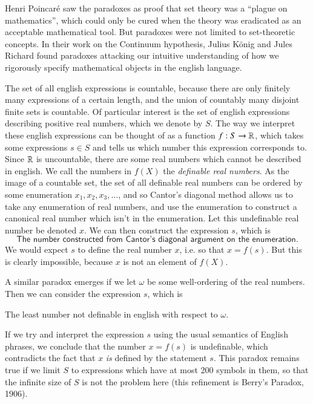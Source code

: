 Henri Poincar\'{e} saw the paradoxes as proof that set theory was a ``plague on mathematics'', which could only be cured when the theory was eradicated as an acceptable mathematical tool. But paradoxes were not limited to set-theoretic concepts. In their work on the Continuum hypothesis, Julius K\"{o}nig and Jules Richard found paradoxes attacking our intuitive understanding of how we rigorously specify mathematical objects in the english language.

\begin{example}
    The set of all english expressions is countable, because there are only finitely many expressions of a certain length, and the union of countably many disjoint finite sets is countable. Of particular interest is the set of english expressions describing positive real numbers, which we denote by $S$. The way we interpret these english expressions can be thought of as a function $f: S \to \operatorname{\mathbb{R}}$, which takes some expressions $s \in S$ and tells us which number this expression corresponds to. Since $\operatorname{\mathbb{R}}$ is uncountable, there are some real numbers which cannot be described in english. We call the numbers in $f(X)$ the \emph{definable real numbers}. As the image of a countable set, the set of all definable real numbers can be ordered by some enumeration $x_1, x_2, x_3, \dots$, and so Cantor's diagonal method allows us to take any enumeration of real numbers, and use the enumeration to construct a canonical real number which isn't in the enumeration. Let this undefinable real number be denoted $x$. We can then construct the expression $s$, which is
    \[ \textsf{The number constructed from Cantor's diagonal argument on the enumeration}. \]
    We would expect $s$ to define the real number $x$, i.e. so that $x = f(s)$. But this is clearly impossible, because $x$ is not an element of $f(X)$.

    A similar paradox emerges if we let $\omega$ be some well-ordering of the real numbers. Then we can consider the expression $s$, which is
    \begin{center}
        \textsf{The least number not definable in english with respect to $\omega$}.
    \end{center}
    If we try and interpret the expression $s$ using the usual semantics of English phrases, we conclude that the number $x = f(s)$ is undefinable, which contradicts the fact that $x$ \emph{is} defined by the statement $s$. This paradox remains true if we limit $S$ to expressions which have at most 200 symbols in them, so that the infinite size of $S$ is not the problem here (this refinement is Berry's Paradox, 1906).
\end{example}

